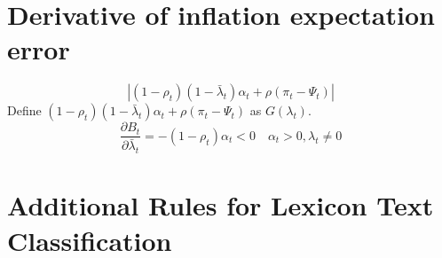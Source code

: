 \documentclass[review]{elsarticle}
\begin{document}
\section{Derivative of inflation expectation error}

\begin{equation}
|(1-\rho_t)(1-\bar{\lambda}_t)\alpha_t + \rho(\pi_t - \Psi_t) |
\end{equation}
Define $(1-\rho_t)(1-\bar{\lambda}_t)\alpha_t + \rho(\pi_t - \Psi_t)$ as $G(\lambda_t)$. 
\begin{equation}
\frac{\partial B_t}{\partial \bar{\lambda}_t} = -(1-\rho_t)\alpha_t < 0 \quad \alpha_t > 0, \lambda_t \neq 0
\end{equation}



\section{Additional Rules for Lexicon Text Classification}\label{sec:Additional Rules for Lexicon Text Classification}
\end{document}
